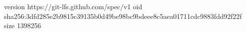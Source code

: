 version https://git-lfs.github.com/spec/v1
oid sha256:3dfd285e2b9815c39135b0d49be98bc9bdeee8c5aea01711cdc9883fdd92f22f
size 1398256
